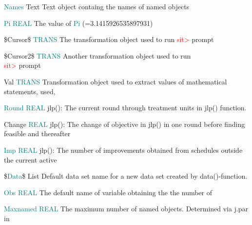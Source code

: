 {\noindent \textcolor{teal}{Names} \tabto{25mm }   Text \tabto{45mm }   Text object containg the names of named objects 
 
 
 
 
\noindent \textcolor{teal}{Pi} \tabto{25mm }  \textcolor{teal}{REAL} \tabto{45mm }  The value of \textcolor{teal}{Pi} (=3.1415926535897931) 
 
 
 
 
 
 
 
 
 
 
 
 
 
 
\noindent \$Cursor\$ \tabto{25mm }   \textcolor{teal}{TRANS}  \tabto{45mm }   The transformation object used to run \textcolor{Red}{sit>} prompt 
 
 
\noindent \$Cursor2\$ \tabto{25mm }   \textcolor{teal}{TRANS}  \tabto{45mm }   Another transformation object used to run \\ 
\tabto{45mm } \textcolor{Red}{sit>} prompt 
 
\noindent Val \tabto{25mm }  \textcolor{teal}{TRANS} \tabto{45mm }   Transformation object used to extract values of mathematical statements, used, 
 
 
\noindent \textcolor{teal}{Round}  \tabto{25mm }  \textcolor{teal}{REAL} \tabto{45mm }   \textcolor{VioletRed}{jlp}(): The current round through treatment units in \textcolor{VioletRed}{jlp}() function. 
 
 
\noindent Change \tabto{25mm }  \textcolor{teal}{REAL} \tabto{45mm }   \textcolor{VioletRed}{jlp}(): The change of objective in \textcolor{VioletRed}{jlp}()  in one round before finding feasible and thereafter 
 
 
\noindent \textcolor{teal}{Imp} \tabto{25mm }  \textcolor{teal}{REAL} \tabto{45mm }   \textcolor{VioletRed}{jlp}(): The number of improvements obtained from schedules outside the current active 
 
 
\noindent \$\textcolor{teal}{Data}\$  \tabto{25mm }   List \tabto{45mm }   Default data set name for a new data set created by \textcolor{VioletRed}{data}()-function. 
 
 
 
 
 
\noindent \textcolor{teal}{Obs} \tabto{25mm }   \textcolor{teal}{REAL}  \tabto{45mm }   The default name of variable obtaining the the number of 
 
\noindent \textcolor{teal}{Maxnamed}  \tabto{25mm }  \textcolor{teal}{REAL} \tabto{45mm }   The maximum number of named objects. Determined via j.par in 
 
}

